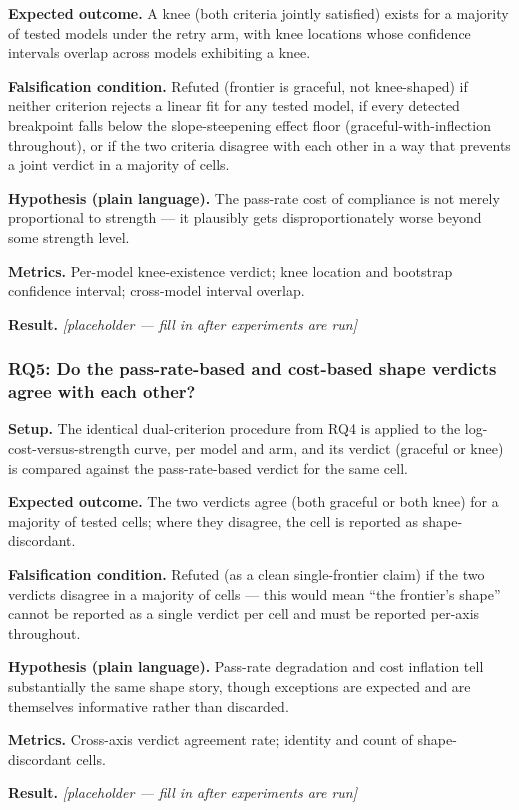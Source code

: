 \documentclass[11pt]{article}
\newcommand{\ph}{\textit{[placeholder --- fill in after experiments are run]}}
\begin{document}
\textbf{Expected outcome.} A knee (both criteria jointly satisfied) exists for a majority of tested models under the retry arm, with knee locations whose confidence intervals overlap across models exhibiting a knee.

\textbf{Falsification condition.} Refuted (frontier is graceful, not knee-shaped) if neither criterion rejects a linear fit for any tested model, if every detected breakpoint falls below the slope-steepening effect floor (graceful-with-inflection throughout), or if the two criteria disagree with each other in a way that prevents a joint verdict in a majority of cells.

\textbf{Hypothesis (plain language).} The pass-rate cost of compliance is not merely proportional to strength --- it plausibly gets disproportionately worse beyond some strength level.

\textbf{Metrics.} Per-model knee-existence verdict; knee location and bootstrap confidence interval; cross-model interval overlap.

\textbf{Result.} \ph

\subsubsection{RQ5: Do the pass-rate-based and cost-based shape verdicts agree with each other?}
\textbf{Setup.} The identical dual-criterion procedure from RQ4 is applied to the log-cost-versus-strength curve, per model and arm, and its verdict (graceful or knee) is compared against the pass-rate-based verdict for the same cell.

\textbf{Expected outcome.} The two verdicts agree (both graceful or both knee) for a majority of tested cells; where they disagree, the cell is reported as shape-discordant.

\textbf{Falsification condition.} Refuted (as a clean single-frontier claim) if the two verdicts disagree in a majority of cells --- this would mean ``the frontier's shape'' cannot be reported as a single verdict per cell and must be reported per-axis throughout.

\textbf{Hypothesis (plain language).} Pass-rate degradation and cost inflation tell substantially the same shape story, though exceptions are expected and are themselves informative rather than discarded.

\textbf{Metrics.} Cross-axis verdict agreement rate; identity and count of shape-discordant cells.

\textbf{Result.} \ph
\end{document}
